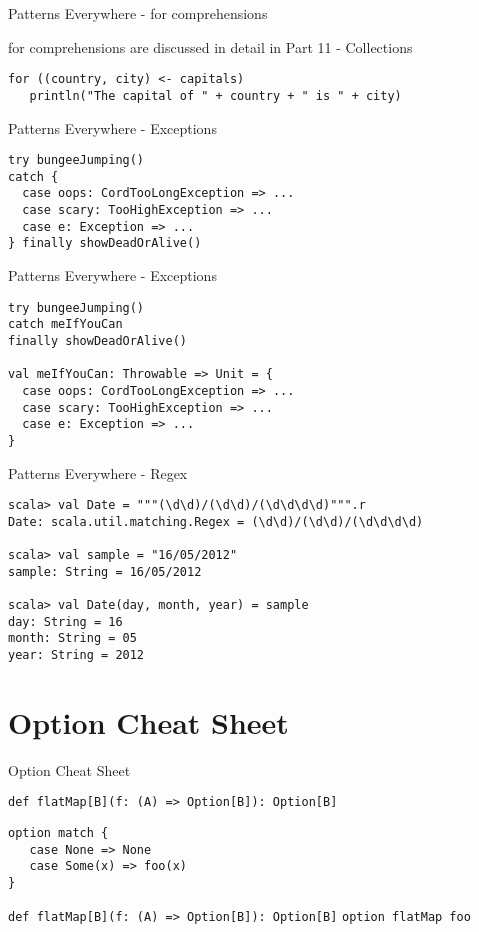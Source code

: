 \begin{frame}[fragile]{Patterns Everywhere - for comprehensions}
\begin{block}{for comprehensions are discussed in detail in Part 11 - Collections}
\begin{lstlisting}
for ((country, city) <- capitals)
   println("The capital of " + country + " is " + city)
\end{lstlisting}
\end{block}
\end{frame}

\begin{frame}[fragile]{Patterns Everywhere - Exceptions}
\begin{lstlisting}
try bungeeJumping()
catch {
  case oops: CordTooLongException => ...
  case scary: TooHighException => ...
  case e: Exception => ...
} finally showDeadOrAlive()
\end{lstlisting}
\end{frame}

\begin{frame}[fragile]{Patterns Everywhere - Exceptions}
\begin{lstlisting}
try bungeeJumping()
catch meIfYouCan
finally showDeadOrAlive()

val meIfYouCan: Throwable => Unit = {
  case oops: CordTooLongException => ...
  case scary: TooHighException => ...
  case e: Exception => ...
}
\end{lstlisting}
\end{frame}

\begin{frame}[fragile]{Patterns Everywhere - Regex}
\begin{lstlisting}
scala> val Date = """(\d\d)/(\d\d)/(\d\d\d\d)""".r
Date: scala.util.matching.Regex = (\d\d)/(\d\d)/(\d\d\d\d)

scala> val sample = "16/05/2012"
sample: String = 16/05/2012

scala> val Date(day, month, year) = sample
day: String = 16
month: String = 05
year: String = 2012
\end{lstlisting}
\end{frame}

\section{Option Cheat Sheet}
\begin{frame}[fragile]{Option Cheat Sheet}
\begin{alertblock}{\lstinline!def flatMap[B](f: (A) => Option[B]): Option[B]!}
\begin{lstlisting}
option match {
   case None => None
   case Some(x) => foo(x)
}
\end{lstlisting}
\end{alertblock}
\begin{exampleblock}{\lstinline!def flatMap[B](f: (A) => Option[B]): Option[B]!}
\lstinline!option flatMap foo!
\end{exampleblock}
\end{frame}

